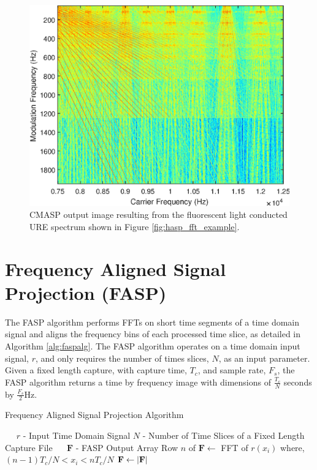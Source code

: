 \begin{figure}[tp]
	\includegraphics[width=\textwidth]{./dasp_algorithm_results/cmasp_filenum_9601.eps}
	\centering
	\caption{CMASP output image resulting from the fluorescent light conducted URE spectrum shown in Figure \ref{fig:hasp_fft_example}.}
	\label{fig:cmasp_example}
\end{figure}

\section[Frequency Aligned Signal Projection (FASP)]{Frequency Aligned Signal Projection (FASP)}
\label{Frequency Aligned Signal Projection}

The FASP algorithm performs FFTs on short time segments of a time domain signal and aligns the frequency bins of each processed time slice, as detailed in Algorithm \ref{alg:faspalg}.  The FASP algorithm operates on a time domain input signal, $r$, and only requires the number of times slices, $N$, as an input parameter.  Given a fixed length capture, with capture time, $T_c$, and sample rate, $F_s$, the FASP algorithm returns a time by frequency image with dimensions of $\frac{T_c}{N}$ seconds by $\frac{F_s}{2}$Hz.

\begin{algorithm}
	\caption{Frequency Aligned Signal Projection Algorithm} \label{alg:faspalg}
	\scriptsize
	\begin{algorithmic}[1]
		\Require~~
		\Statex $r$ - Input Time Domain Signal
		\Statex $N$ - Number of Time Slices of a Fixed Length Capture File
		\Ensure~~
		\Statex $\mathbf{F}$ - FASP Output Array
		\Statex
		\State Row $n$ of $\mathbf{F} \gets $ FFT of $r(x_i)$ where, $(n - 1)T_c/N < x_i < nT_c/N$
		\EndFor
		\State $\mathbf{F} \gets \left|\bf{F}\right|$
	\end{algorithmic}
\end{algorithm}

